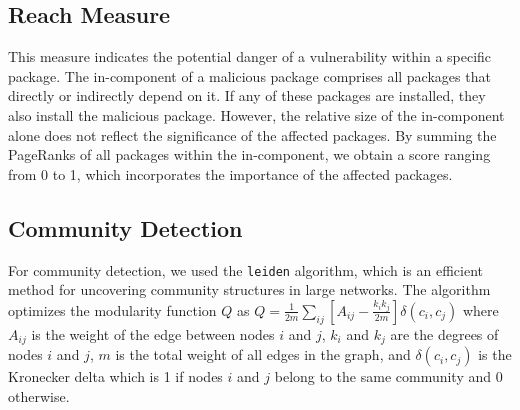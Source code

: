 \documentclass[9pt,twocolumn,twoside]{pnas-report}
\begin{document}
\subsection*{Reach Measure} This measure indicates the potential danger of a vulnerability within a specific package.
The in-component of a malicious package comprises all packages that directly or indirectly depend on it.
If any of these packages are installed, they also install the malicious package.
However, the relative size of the in-component alone does not reflect the significance of the affected packages.
By summing the PageRanks of all packages within the in-component, we obtain a score ranging from 0 to 1, which incorporates the importance of the affected packages.


\subsection*{Community Detection} For community detection, we used the \texttt{leiden} algorithm, which is an efficient method for uncovering community structures in large networks.
The algorithm optimizes the modularity function $ Q $ as $
	Q = \frac{1}{2m} \sum_{ij} \left[ A_{ij} - \frac{k_i k_j}{2m} \right] \delta(c_i, c_j)
$
where \( A_{ij} \) is the weight of the edge between nodes \( i \) and \( j \), \( k_i \) and \( k_j \) are the degrees of nodes \( i \) and \( j \), \( m \) is the total weight of all edges in the graph, and \( \delta(c_i, c_j) \) is the Kronecker delta which is 1 if nodes \( i \) and \( j \) belong to the same community and 0 otherwise.

\normalsize



\end{document}
